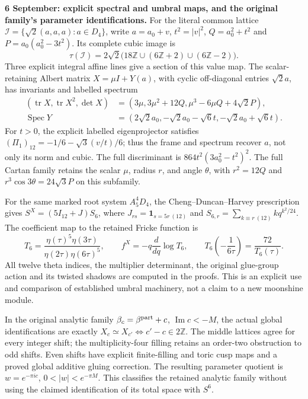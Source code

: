 \documentclass[10pt,letterpaper]{article}
\begin{document}
\noindent\textbf{6 September: explicit spectral and umbral maps, and the original family's parameter identifications.}
For the literal common lattice $\mathcal I=\{\sqrt2(a,a,a):a\in D_4\}$,
write $a=a_0+v$, $t^2=|v|^2$, $Q=a_0^2+t^2$ and
$P=a_0(a_0^2-3t^2)$. Its complete cubic image is
\[
 \tau(\mathcal I)=2\sqrt2\bigl(18\mathbb Z\cup(6\mathbb Z+2)
                                      \cup(6\mathbb Z-2)\bigr).
\]
Three explicit integral affine lines give a section of this value map.
The scalar-retaining Albert matrix $X=\mu I+Y(a)$, with cyclic
off-diagonal entries $\sqrt2a$, has invariants and labelled spectrum
\[
\begin{aligned}
 (\operatorname{tr}X,\operatorname{tr}X^2,\det X)
   &=(3\mu,3\mu^2+12Q,\mu^3-6\mu Q+4\sqrt2P),\\
 \operatorname{Spec}Y
   &=(2\sqrt2a_0,-\sqrt2a_0-\sqrt6t,-\sqrt2a_0+\sqrt6t).
\end{aligned}
\]
For $t>0$, the explicit labelled eigenprojector satisfies
$(\Pi_1)_{12}=-1/6-\sqrt3(v/t)/6$; thus the frame and spectrum
recover $a$, not only its norm and cubic. The full discriminant is
$864t^2(3a_0^2-t^2)^2$. The full Cartan family retains the scalar
$\mu$, radius $r$, and angle $\theta$, with $r^2=12Q$ and
$r^3\cos3\theta=24\sqrt3P$ on this subfamily.

For the same marked root system $A_5^4D_4$, the
Cheng--Duncan--Harvey prescription gives
$S^X=(5I_{12}+J)S_6$, where $J_{rs}=\mathbf1_{s=5r\ (12)}$ and
$S_{6,r}=\sum_{k\equiv r\ (12)}kq^{k^2/24}$.
The coefficient map to the retained Fricke function is
\[
 T_6=\frac{\eta(\tau)^5\eta(3\tau)}{\eta(2\tau)\eta(6\tau)^5},
 \qquad f^X=-q\frac{d}{dq}\log T_6,
 \qquad T_6\!\left(-\frac1{6\tau}\right)=\frac{72}{T_6(\tau)}.
\]
All twelve theta indices, the multiplier determinant, the original
glue-group action and its twisted shadows are computed in the proofs.
This is an explicit use and comparison of established umbral machinery,
not a claim to a new moonshine module.

In the original analytic family $\beta_c=\beta^{\rm part}+c$,
$\operatorname{Im}c<-M$, the actual global identifications are exactly
$X_c\simeq X_{c'}\Longleftrightarrow c'-c\in2\mathbb Z$.
The middle lattices agree for every integer shift; the multiplicity-four
filling retains an order-two obstruction to odd shifts. Even shifts have
explicit finite-filling and toric cusp maps and a proved global additive
gluing correction. The resulting parameter quotient is
$w=e^{-\pi ic}$, $0<|w|<e^{-\pi M}$.
This classifies the retained analytic family without using the claimed
identification of its total space with $S^6$.
\end{document}
